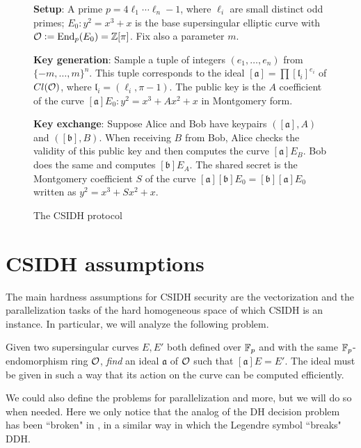 \begin{figure}
    \begin{framed}
        \textbf{Setup}: A prime $p=4\ell_1\cdots\ell_n-1$, where $\ell_i$ are small distinct odd primes; $E_0:y^2=x^3+x$ is the base supersingular elliptic curve with $\mathcal{O}:=\operatorname{End}_p(E_0)=\mathbb{Z}[\pi]$. Fix also a parameter $m$.
        
        \textbf{Key generation}: Sample a tuple of integers $(e_1,\dots,e_n)$ from $\{ -m,\dots,m \}^n$. This tuple corresponds to the ideal $[\mathfrak{a}] = \prod [\mathfrak{l}_i]^{e_i}$ of $Cl(\mathcal{O})$, where $\mathfrak{l}_i=(\ell_i, \pi-1)$. The public key is the $A$ coefficient of the curve $[\mathfrak{a}]E_0:y^2=x^3+Ax^2+x$ in Montgomery form.
        
        \textbf{Key exchange}: Suppose Alice and Bob have keypairs $([\mathfrak{a}], A)$ and $([\mathfrak{b}], B)$. When receiving $B$ from Bob, Alice checks the validity of this public key and then computes the curve $[\mathfrak{a}]E_B$. Bob does the same and computes $[\mathfrak{b}]E_A$. The shared secret is the Montgomery coefficient $S$ of the curve $[\mathfrak{a}][\mathfrak{b}]E_0=[\mathfrak{b}][\mathfrak{a}]E_0$ written as $y^2=x^3+Sx^2+x$.
    \end{framed}
    \caption{The CSIDH protocol}
    \label{prot_CSIDH}
\end{figure}


\section{CSIDH assumptions}
The main hardness assumptions for CSIDH security are the vectorization and the parallelization tasks of the hard homogeneous space of which CSIDH is an instance. In particular, we will analyze the following problem.

\begin{problem}\label{problem_csidh}
    Given two supersingular curves $E,E'$ both defined over $\mathbb{F}_p$ and with the same $\mathbb{F}_p$-endomorphism ring $\mathcal{O}$, \emph{find} an ideal $\mathfrak{a}$ of $\mathcal{O}$ such that $[\mathfrak{a}]E=E'$. The ideal must be given in such a way that its action on the curve can be computed efficiently.
\end{problem}

We could also define the problems for parallelization and more, but we will do so when needed. Here we only notice that the analog of the DH decision problem has been ``broken" in \cite{breaking_DDH}, in a similar way in which the Legendre symbol ``breaks" DDH.

